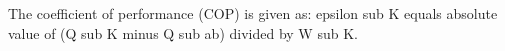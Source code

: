 The coefficient of performance (COP) is given as:  
epsilon sub K equals absolute value of (Q sub K minus Q sub ab) divided by W sub K.